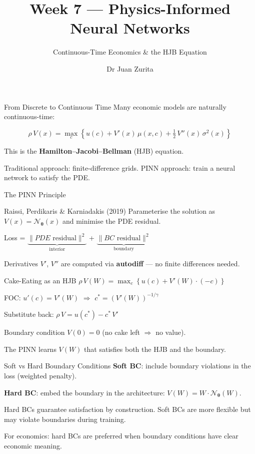 \documentclass[aspectratio=169, 10pt]{beamer}
\title{Week 7 --- Physics-Informed Neural Networks}
\subtitle{Continuous-Time Economics \& the HJB Equation}
\author{Dr Juan Zurita}
\institute{Deep Learning for Macroeconomics\\
The University of Edinburgh~$\cdot$~School of Economics}
\date{}
\begin{document}
\maketitle

\begin{frame}{From Discrete to Continuous Time}
Many economic models are naturally continuous-time:

$$\rho\,V(x) = \max_c\!\left\{u(c) + V'(x)\,\mu(x,c) + \tfrac{1}{2}\,V''(x)\,\sigma^2(x)\right\}$$

\bigskip
This is the \textbf{Hamilton--Jacobi--Bellman} (HJB) equation.

\bigskip
Traditional approach: finite-difference grids. PINN approach: train a neural network to satisfy the PDE.
\end{frame}

\begin{frame}{The PINN Principle}
\begin{block}{Raissi, Perdikaris \& Karniadakis (2019)}
Parameterise the solution as $V(x) = \mathcal{N}_{\boldsymbol{\theta}}(x)$ and minimise the PDE residual.
\end{block}

\bigskip
Loss = $\underbrace{\|PDE\text{ residual}\|^2}_{\text{interior}}$ + $\underbrace{\|BC\text{ residual}\|^2}_{\text{boundary}}$

\bigskip
Derivatives $V'$, $V''$ are computed via \textbf{autodiff} --- no finite differences needed.
\end{frame}

\begin{frame}{Cake-Eating as an HJB}
$\rho\,V(W) = \max_c\left\{u(c) + V'(W)\cdot(-c)\right\}$

\bigskip
FOC: $u'(c) = V'(W)$ $\Rightarrow$ $c^* = (V'(W))^{-1/\gamma}$

\bigskip
Substitute back: $\rho\,V = u(c^*) - c^*\,V'$

\bigskip
\begin{block}{Boundary condition}
$V(0) = 0$ (no cake left $\Rightarrow$ no value).
\end{block}

\bigskip
The PINN learns $V(W)$ that satisfies both the HJB and the boundary.
\end{frame}

\begin{frame}{Soft vs Hard Boundary Conditions}
\textbf{Soft BC}: include boundary violations in the loss (weighted penalty).

\textbf{Hard BC}: embed the boundary in the architecture: $V(W) = W \cdot \mathcal{N}_{\boldsymbol{\theta}}(W)$.

\bigskip
Hard BCs guarantee satisfaction by construction. Soft BCs are more flexible but may violate boundaries during training.

\bigskip
For economics: hard BCs are preferred when boundary conditions have clear economic meaning.
\end{frame}
\end{document}
